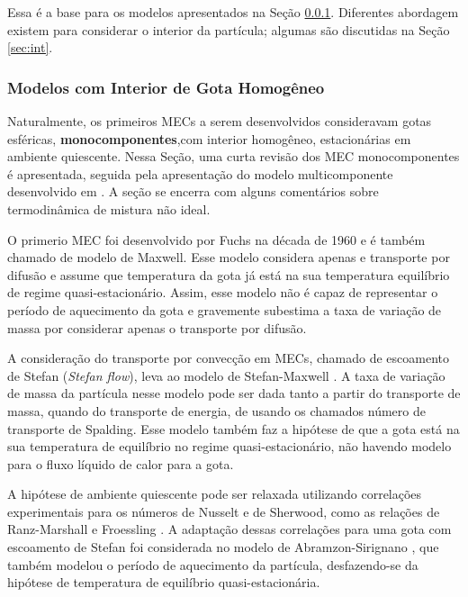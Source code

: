 Essa é a base para os modelos apresentados na Seção \ref{sec:RMM}.
Diferentes abordagem existem para considerar o interior da partícula; algumas são discutidas na Seção \ref{sec:int}.




\subsubsection{Modelos com Interior de Gota Homogêneo} \label{sec:RMM}

Naturalmente, os primeiros MECs a serem desenvolvidos consideravam gotas esféricas, \textbf{monocomponentes},com interior homogêneo, estacionárias em ambiente quiescente.
Nessa Seção, uma curta revisão dos MEC monocomponentes é apresentada, seguida pela apresentação do modelo multicomponente desenvolvido em \cite{SacomanoF2022IJHMT}.
A seção se encerra com alguns comentários sobre termodinâmica de mistura não ideal.

O primerio MEC foi desenvolvido por Fuchs \cite{Fuchs1959} na década de 1960 e é também chamado de modelo de Maxwell.
Esse modelo considera apenas e transporte por difusão e assume que temperatura da gota já está na sua temperatura equilíbrio de regime quasi-estacionário.
Assim, esse modelo não é capaz de representar o período de aquecimento da gota e gravemente subestima a taxa de variação de massa por considerar apenas o transporte por difusão.

A consideração do transporte por convecção em MECs, chamado de escoamento de Stefan (\emph{Stefan flow}), leva ao modelo de Stefan-Maxwell \cite{Law1978}.
A taxa de variação de massa da partícula nesse modelo pode ser dada tanto a partir do transporte de massa, quando do transporte de energia, de usando os chamados número de transporte de Spalding.
Esse modelo também faz a hipótese de que a gota está na sua temperatura de equilíbrio no regime quasi-estacionário, não havendo modelo para o fluxo líquido de calor para a gota.

A hipótese de ambiente quiescente pode ser relaxada utilizando correlações experimentais para os números de Nusselt e de Sherwood, como as relações de Ranz-Marshall e Froessling \cite{Bird2002}. 
A adaptação dessas correlações para uma gota com escoamento de Stefan foi considerada no modelo de Abramzon-Sirignano \cite{Sirignano1989}, que também modelou o período de aquecimento da partícula, desfazendo-se da hipótese de temperatura de equilíbrio quasi-estacionária.

